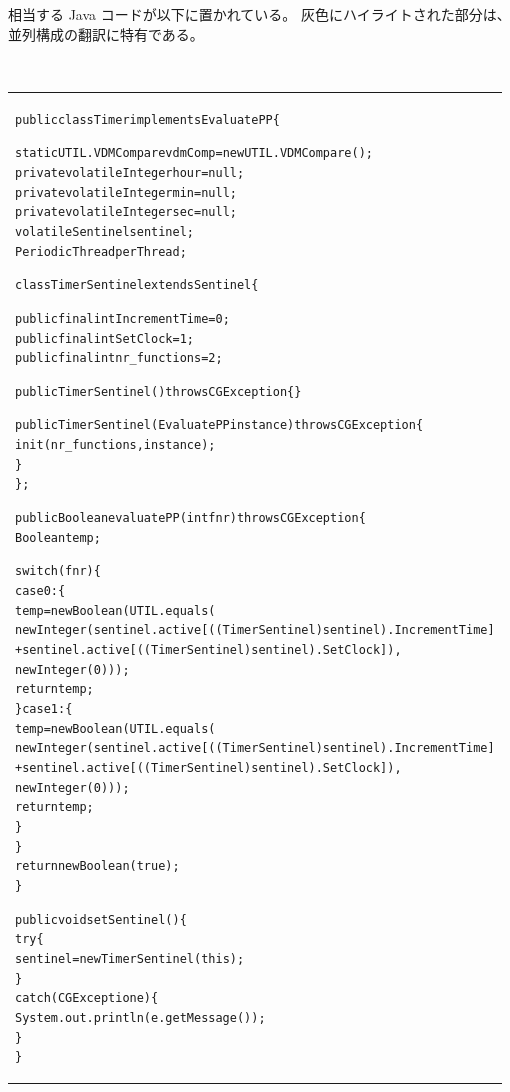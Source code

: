 \documentclass[\pformat,11pt]{jarticle}
\newlength{\negoneline}
\newcommand{\listingsize}[0]{\renewcommand{\baselinestretch}{0.95}\tt\footnotesize}
\newcommand{\startbox}[0]{
\begin{center}
\listingsize  
\begin{tabular}{|p{.975\textwidth}|}\hline\vspace{\negoneline}}
\newcommand{\interruptbox}[0]{
\end{tabular}
\end{center}}
\newcommand{\scriptlistingsize}[0]{\tt\scriptsize}
\newcommand{\gbx}[1]{\colorbox{bggray}{#1}}
\begin{document}
相当する Java コードが以下に置かれている。
灰色にハイライトされた部分は、並列構成の翻訳に特有である。


\startbox
{\scriptlistingsize\begin{alltt} 
public class Timer \gbx{implements EvaluatePP} \{

  static UTIL.VDMCompare vdmComp = new UTIL.VDMCompare();
  private \gbx{volatile} Integer hour = null;
  private \gbx{volatile} Integer min = null;
  private \gbx{volatile} Integer sec = null;
  \gbx{volatile Sentinel sentinel};
  \gbx{PeriodicThread perThread};

  \gbx{class TimerSentinel extends Sentinel \{}

    public final int IncrementTime = 0;
    public final int SetClock = 1;
    public final int nr_functions = 2;

    public TimerSentinel () throws CGException\{\}

    public TimerSentinel (EvaluatePP instance) throws CGException\{
      init(nr_functions, instance);
    \}
  \};

  \gbx{public Boolean evaluatePP (int fnr) throws CGException\{}
    Boolean temp;    

    switch(fnr) \{    
    case 0: \{
      temp = new Boolean(UTIL.equals(
               new Integer(sentinel.active[((TimerSentinel) sentinel).IncrementTime] 
                           + sentinel.active[((TimerSentinel) sentinel).SetClock]), 
               new Integer(0)));
      return temp;
    \}    case 1: \{
      temp = new Boolean(UTIL.equals(
               new Integer(sentinel.active[((TimerSentinel) sentinel).IncrementTime] 
                           + sentinel.active[((TimerSentinel) sentinel).SetClock]), 
               new Integer(0)));
      return temp;
    \}
    \}
    return new Boolean(true);
  \}

  \gbx{public void setSentinel () \{}
    try\{
      sentinel = new TimerSentinel(this);
    \}
    catch (CGException e) \{
      System.out.println(e.getMessage());
    \}
  \}


\end{alltt}}
\interruptbox 
\end{document}
